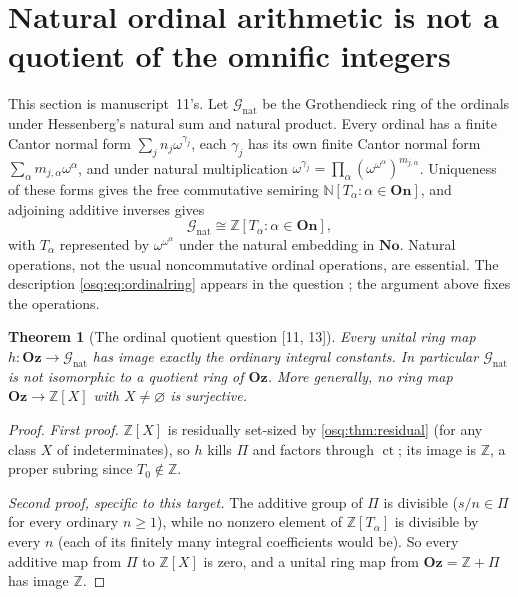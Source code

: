 \documentclass[11pt,letterpaper]{article}
\numberwithin{equation}{section}
\newtheorem{theorem}{Theorem}[section]
\theoremstyle{definition}
\theoremstyle{remark}
\theoremstyle{plain}
\newcommand{\No}{\mathbf{No}}
\newcommand{\On}{\mathbf{On}}
\newcommand{\Oz}{\mathbf{Oz}}
\newcommand{\Z}{\mathbb Z}
\newcommand{\N}{\mathbb N}
\newcommand{\ct}{\operatorname{ct}}
\newcommand{\src}[1]{\textup{\textsf{[#1]}}}
\begin{document}
\section{Natural ordinal arithmetic is not a quotient of the omnific integers}\label{osq:sec:ordinal}

This section is manuscript~11's. Let $\mathcal G_{\mathrm{nat}}$ be the Grothendieck ring of the
ordinals under Hessenberg's natural sum and natural product. Every ordinal has a finite Cantor normal
form $\sum_jn_j\omega^{\gamma_j}$, each $\gamma_j$ has its own finite Cantor normal form
$\sum_\alpha m_{j,\alpha}\omega^\alpha$, and under natural multiplication
$\omega^{\gamma_j}=\prod_\alpha(\omega^{\omega^\alpha})^{m_{j,\alpha}}$. Uniqueness of these forms gives
the free commutative semiring $\N[T_\alpha:\alpha\in\On]$, and adjoining additive inverses gives
\begin{equation}\label{osq:eq:ordinalring}
 \mathcal G_{\mathrm{nat}}\cong\Z[T_\alpha:\alpha\in\On],
\end{equation}
with $T_\alpha$ represented by $\omega^{\omega^\alpha}$ under the natural embedding in $\No$. Natural
operations, not the usual noncommutative ordinal operations, are essential. The description
\eqref{osq:eq:ordinalring} appears in the question \cite{MO188430}; the argument above fixes the operations.

\begin{theorem}[The ordinal quotient question \src{11, 13}]\label{osq:thm:ordinal}
Every unital ring map $h:\Oz\to\mathcal G_{\mathrm{nat}}$ has image exactly the ordinary integral
constants. In particular $\mathcal G_{\mathrm{nat}}$ is not isomorphic to a quotient ring of $\Oz$.
More generally, no ring map $\Oz\to\Z[X]$ with $X\ne\varnothing$ is surjective.
\end{theorem}
\begin{proof}
\emph{First proof.} $\Z[X]$ is residually set-sized by \cref{osq:thm:residual} (for any class $X$ of
indeterminates), so $h$ kills $\Pi$ and factors through $\ct$; its image is $\Z$, a proper subring
since $T_0\notin\Z$.

\emph{Second proof, specific to this target.} The additive group of $\Pi$ is divisible
($s/n\in\Pi$ for every ordinary $n\ge1$), while no nonzero element of $\Z[T_\alpha]$ is divisible by
every $n$ (each of its finitely many integral coefficients would be). So every additive map from $\Pi$
to $\Z[X]$ is zero, and a unital ring map from $\Oz=\Z+\Pi$ has image $\Z$.
\end{proof}
\end{document}
